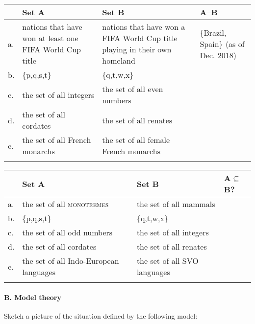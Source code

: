 {\vspace*{1cm}
\noindent
\begin{tabularx}{\textwidth}{lQQQ}
\lsptoprule
 & Set A & Set B & A–B\\
 \midrule
a. & nations that have won at least one FIFA World Cup title & nations that have won a FIFA World Cup title playing in their own homeland
& \{Brazil, Spain\} (as of Dec. 2018) \\
\tablevspace
b. & \{p,q,s,t\} & \{q,t,w,x\} & \\
\tablevspace
c. & the set of all integers & the set of all even numbers & \\
\tablevspace
d. & the set of all cordates & the set of all renates & \\
\tablevspace
e. & the set of all {French} monarchs & the set of all female {French} monarchs & \\
\lspbottomrule
\end{tabularx}
\bigskip 

\noindent
\begin{tabularx}{\textwidth}{lQQQ}
\lsptoprule
&  Set A & Set B & A${\subseteq}$B?\\
\midrule
a. & the set of all \textsc{monotremes} &  the set of all mammals & \\
\tablevspace

b. & \{p,q,s,t\} & \{q,t,w,x\} & \\
\tablevspace

c. & the set of all odd numbers & the set of all integers & \\
\tablevspace

d. & the set of all cordates & the set of all renates & \\
\tablevspace

e. & the set of all Indo-European  languages & the set of all SVO languages & \\
\lspbottomrule
\end{tabularx}

\bigskip


\paragraph*{B. Model theory}
\largerpage
\ea  
         Sketch a picture of the situation defined by the following model:

}
